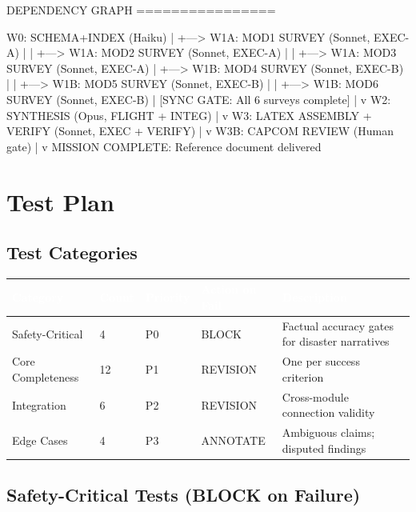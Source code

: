\documentclass[11pt,letterpaper]{article}
\newcommand{\tableheader}[1]{\textbf{\sffamily\textcolor{white}{#1}}}
\begin{document}
\begin{asciibox}
DEPENDENCY GRAPH
================

W0: SCHEMA+INDEX (Haiku)
  |
  +---> W1A: MOD1 SURVEY (Sonnet, EXEC-A)
  |        |
  +---> W1A: MOD2 SURVEY (Sonnet, EXEC-A)
  |        |
  +---> W1A: MOD3 SURVEY (Sonnet, EXEC-A)
  |
  +---> W1B: MOD4 SURVEY (Sonnet, EXEC-B)
  |        |
  +---> W1B: MOD5 SURVEY (Sonnet, EXEC-B)
  |        |
  +---> W1B: MOD6 SURVEY (Sonnet, EXEC-B)
  |
  [SYNC GATE: All 6 surveys complete]
  |
  v
W2: SYNTHESIS (Opus, FLIGHT + INTEG)
  |
  v
W3: LATEX ASSEMBLY + VERIFY (Sonnet, EXEC + VERIFY)
  |
  v
W3B: CAPCOM REVIEW (Human gate)
  |
  v
MISSION COMPLETE: Reference document delivered
\end{asciibox}

\section{Test Plan}

\subsection{Test Categories}

\begin{center}
\begin{tabularx}{\textwidth}{L{3cm}C{1.5cm}C{1.5cm}L{2cm}X}
\toprule
{}
\tableheader{Category} & \tableheader{Count} & \tableheader{Priority} & \tableheader{Action on Fail} & \tableheader{Description} \\
\midrule
Safety-Critical & 4 & P0 & BLOCK & Factual accuracy gates for disaster narratives \\
Core Completeness & 12 & P1 & REVISION & One per success criterion \\
Integration & 6 & P2 & REVISION & Cross-module connection validity \\
Edge Cases & 4 & P3 & ANNOTATE & Ambiguous claims; disputed findings \\
\bottomrule
\end{tabularx}
\end{center}

\subsection{Safety-Critical Tests (BLOCK on Failure)}
\end{document}
